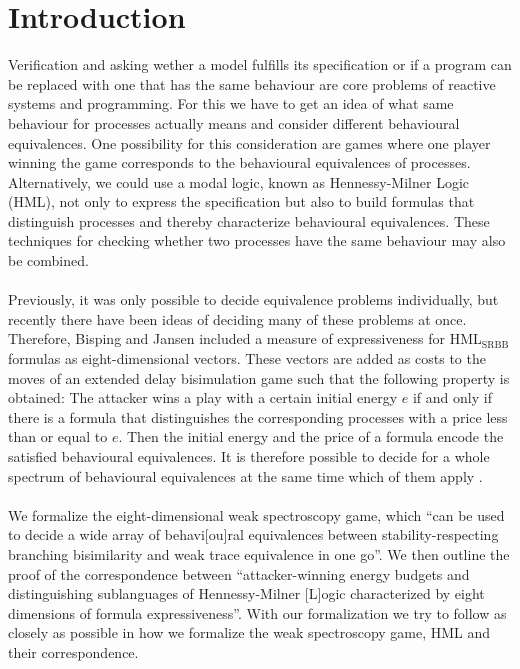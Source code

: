 \newpage
\section{Introduction} 
Verification and asking wether a model fulfills its specification or if a program can be replaced with one that has the same behaviour are core problems of reactive systems and programming.
For this we have to get an idea of what same behaviour for processes actually means and consider different behavioural equivalences.
One possibility for this consideration are games where one player winning the game corresponds to the behavioural equivalences of processes.
Alternatively, we could use a modal logic, known as Hennessy-Milner Logic (HML), not only to express the specification but also to build formulas that distinguish processes and 
thereby characterize behavioural equivalences.
These techniques for checking whether two processes have the same behaviour may also be combined.
\\\\
Previously, it was only possible to decide equivalence problems individually, but recently there have been ideas of deciding many of these problems at once.
Therefore, Bisping and Jansen \cite{bj2023silentStepSpectroscopyArxiv} included a measure of expressiveness for HML$_\text{{SRBB}}$ formulas as eight-dimensional vectors.
These vectors are added as costs to the moves of an extended delay bisimulation game such that the following property is obtained: 
The attacker wins a play with a certain initial energy $e$ if and only if there is a formula that distinguishes the corresponding processes with a price less than or equal to $e$.
Then the initial energy and the price of a formula encode the satisfied behavioural equivalences.
It is therefore possible to decide for a whole spectrum of behavioural equivalences at the same time which of them apply \cite{bj2023silentStepSpectroscopyArxiv}.
\\\\
We formalize the eight-dimensional weak spectroscopy game, 
which ``can be used to decide a wide array of behavi[ou]ral equivalences between stability-respecting branching bisimilarity and weak trace equivalence in one go''\cite[Abstract]{bj2023silentStepSpectroscopyArxiv}.
We then outline the proof of the correspondence between ``attacker-winning energy budgets and distinguishing sublanguages of Hennessy-Milner [L]ogic characterized by eight dimensions of formula expressiveness''\cite[Abstract]{bj2023silentStepSpectroscopyArxiv}.
With our formalization we try to follow \cite{bj2023silentStepSpectroscopyArxiv} as closely as possible in how we formalize the weak spectroscopy game, HML and their correspondence.
